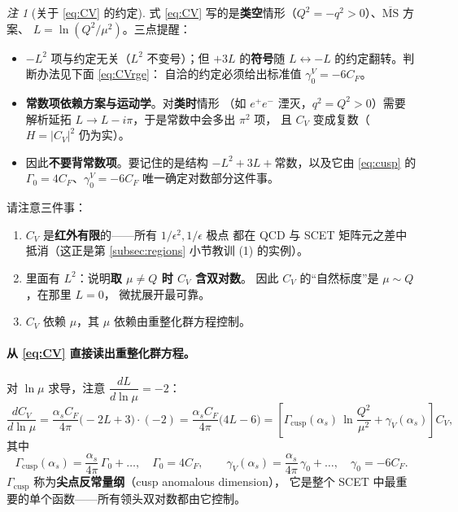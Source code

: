\documentclass[UTF8,a4paper,11pt]{ctexart}
\theoremstyle{definition}
\theoremstyle{remark}
\newtheorem{remark}{注}[section]
\theoremstyle{plain}
\newcommand{\as}{\alpha_s}
\newcommand{\CF}{C_F}
\newcommand{\muMS}{\overline{\mathrm{MS}}}
\newcommand{\Gcusp}{\Gamma_{\mathrm{cusp}}}
\newcommand{\en}[1]{\textsf{#1}}   %
\begin{document}
\begin{remark}[关于 \eqref{eq:CV} 的约定]
式 \eqref{eq:CV} 写的是\textbf{类空}情形（$Q^2=-q^2>0$）、$\muMS$ 方案、
$L=\ln(Q^2/\mu^2)$。三点提醒：
\begin{itemize}
  \item $-L^2$ 项与约定无关（$L^2$ 不变号）；但 $+3L$ 的\textbf{符号}随
        $L\leftrightarrow-L$ 的约定翻转。判断办法见下面 \eqref{eq:CVrge}：
        自洽的约定必须给出标准值 $\gamma_0^V=-6\CF$。
  \item \textbf{常数项依赖方案与运动学}。对\textbf{类时}情形
        （如 $e^+e^-$ 湮灭，$q^2=Q^2>0$）需要解析延拓
        $L\to L-i\pi$，于是常数中会多出 $\pi^2$ 项，
        且 $C_V$ 变成复数（$H=|C_V|^2$ 仍为实）。
  \item 因此\textbf{不要背常数项}。要记住的是结构
        $-L^2+3L+\text{常数}$，以及它由 \eqref{eq:cusp} 的
        $\Gamma_0=4\CF$、$\gamma_0^V=-6\CF$ 唯一确定对数部分这件事。
\end{itemize}
\end{remark}

请注意三件事：

\begin{enumerate}[label=(\arabic*)]
  \item $C_V$ 是\textbf{红外有限}的——所有 $1/\epsilon^2,1/\epsilon$ 极点
        都在 QCD 与 SCET 矩阵元之差中抵消（这正是第
        \ref{subsec:regions} 小节教训 (1) 的实例）。
  \item 里面有 $L^2$：说明\textbf{取 $\mu\ne Q$ 时 $C_V$ 含双对数}。
        因此 $C_V$ 的“自然标度”是 $\mu\sim Q$，在那里 $L=0$，
        微扰展开最可靠。
  \item $C_V$ 依赖 $\mu$，其 $\mu$ 依赖由重整化群方程控制。
\end{enumerate}

\paragraph{从 \eqref{eq:CV} 直接读出重整化群方程。}
对 $\ln\mu$ 求导，注意 $\dfrac{dL}{d\ln\mu}=-2$：
\begin{equation}
  \frac{d C_V}{d\ln\mu}
  =\frac{\as\CF}{4\pi}\big(-2L+3\big)\cdot(-2)
  =\frac{\as\CF}{4\pi}\big(4L-6\big)
  =\left[\Gcusp(\as)\,\ln\frac{Q^2}{\mu^2}+\gamma_V(\as)\right]C_V ,
  \label{eq:CVrge}
\end{equation}
其中
\begin{equation}
  \Gcusp(\as)=\frac{\as}{4\pi}\,\Gamma_0+\dots,\quad \Gamma_0=4\CF ,
  \qquad
  \gamma_V(\as)=\frac{\as}{4\pi}\,\gamma_0+\dots,\quad \gamma_0=-6\CF .
  \label{eq:cusp}
\end{equation}
$\Gcusp$ 称为\textbf{尖点反常量纲}（\en{cusp anomalous dimension}），
它是整个 SCET 中最重要的单个函数——所有领头双对数都由它控制。
\end{document}
